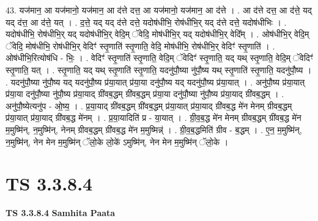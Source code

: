 \documentclass[17pt]{extarticle}
\begin{document}
43. यज॑मान॒ आ यज॑मानो॒ यज॑मान॒ आ द॑त्ते दत्त॒ आ यज॑मानो॒ यज॑मान॒ आ द॑त्ते । . आ द॑त्ते दत्त॒ आ द॑त्ते॒ यद् यद् द॑त्त॒ आ द॑त्ते॒ यत् । . द॒त्ते॒ यद् यद् द॑त्ते दत्ते॒ यदोष॑धीभि॒ रोष॑धीभि॒र् यद् द॑त्ते दत्ते॒ यदोष॑धीभिः । . यदोष॑धीभि॒ रोष॑धीभि॒र् यद् यदोष॑धीभि॒र् वेदि॒म् ॅवेदि॒ मोष॑धीभि॒र् यद् यदोष॑धीभि॒र् वेदि᳚म् । . ओष॑धीभि॒र् वेदि॒म् ॅवेदि॒ मोष॑धीभि॒ रोष॑धीभि॒र् वेदिꣳ॑ स्तृ॒णाति॑ स्तृ॒णाति॒ वेदि॒ मोष॑धीभि॒ रोष॑धीभि॒र् वेदिꣳ॑ स्तृ॒णाति॑ । . ओष॑धीभि॒रित्योष॑धि - भिः॒ । . वेदिꣳ॑ स्तृ॒णाति॑ स्तृ॒णाति॒ वेदि॒म् ॅवेदिꣳ॑ स्तृ॒णाति॒ यद् यथ् स्तृ॒णाति॒ वेदि॒म् ॅवेदिꣳ॑ स्तृ॒णाति॒ यत् । . स्तृ॒णाति॒ यद् यथ् स्तृ॒णाति॑ स्तृ॒णाति॒ यदनु॑पौ॒ष्या नु॑पौ॒ष्य यथ् स्तृ॒णाति॑ स्तृ॒णाति॒ यदनु॑पौ॒ष्य । . यदनु॑पौ॒ष्या नु॑पौ॒ष्य यद् यदनु॑पौ॒ष्य प्र॑या॒यात् प्र॑या॒या दनु॑पौ॒ष्य यद् यदनु॑पौ॒ष्य प्र॑या॒यात् । . अनु॑पौ॒ष्य प्र॑या॒यात् प्र॑या॒या दनु॑पौ॒ष्या नु॑पौ॒ष्य प्र॑या॒याद् ग्री॑वब॒द्धम् ग्री॑वब॒द्धम् प्र॑या॒या दनु॑पौ॒ष्या नु॑पौ॒ष्य प्र॑या॒याद् ग्री॑वब॒द्धम् । . अनु॑पौ॒ष्येत्यनु॑प - ओ॒ष्य॒ । . प्र॒या॒याद् ग्री॑वब॒द्धम् ग्री॑वब॒द्धम् प्र॑या॒यात् प्र॑या॒याद् ग्री॑वब॒द्ध मे॑न मेनम् ग्रीवब॒द्धम् प्र॑या॒यात् प्र॑या॒याद् ग्री॑वब॒द्ध मे॑नम् । . प्र॒या॒यादिति॑ प्र - या॒यात् । . ग्री॒व॒ब॒द्ध मे॑न मेनम् ग्रीवब॒द्धम् ग्री॑वब॒द्ध मे॑न म॒मुष्मि॑न्, न॒मुष्मि॑न्, नेनम् ग्रीवब॒द्धम् ग्री॑वब॒द्ध मे॑न म॒मुष्मिन्न्॑ । . ग्री॒व॒ब॒द्धमिति॑ ग्रीव - ब॒द्धम् । . ए॒न॒ म॒मुष्मि॑न्, न॒मुष्मि॑न्, नेन मेन म॒मुष्मि॑न् ॅलो॒के लो॒के॑ ऽमुष्मि॑न्, नेन मेन म॒मुष्मि॑न् ॅलो॒के । \newline
\pagebreak
{}

\section{ TS 3.3.8.4 }

\textbf{TS 3.3.8.4 } \newline
\textbf{Samhita Paata} \newline
\end{document}
